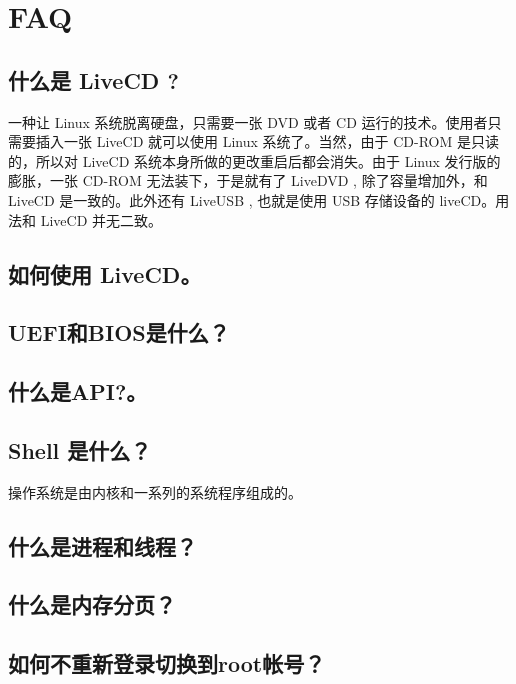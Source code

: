 \renewcommand{\thesection}{\arabic{section}}

\chapter{FAQ}\label{FAQ}

\section{什么是 LiveCD ?}\label{FAQ:LiveCD}
一种让 Linux 系统脱离硬盘，只需要一张 DVD 或者 CD 运行的技术。使用者只需要插入一张 LiveCD 就可以使用 Linux  系统了。当然，由于 CD-ROM 是只读的，所以对 LiveCD 系统本身所做的更改重启后都会消失。由于 Linux 发行版的膨胀，一张 CD-ROM 无法装下，于是就有了 LiveDVD , 除了容量增加外，和LiveCD 是一致的。此外还有 LiveUSB , 也就是使用 USB 存储设备的 liveCD。用法和 LiveCD 并无二致。

\section{如何使用 LiveCD。}\label{FAQ:UseLiveCD}

\section{UEFI和BIOS是什么？}


\section{什么是API?。}\label{FAQ:API}

\section{Shell 是什么？}
操作系统是由内核和一系列的系统程序组成的。

\section{什么是进程和线程？}\label{FAQ:Process}

\section{什么是内存分页？}\label{FAQ:Paging}

\section{如何不重新登录切换到root帐号？}\label{FAQ:su}

